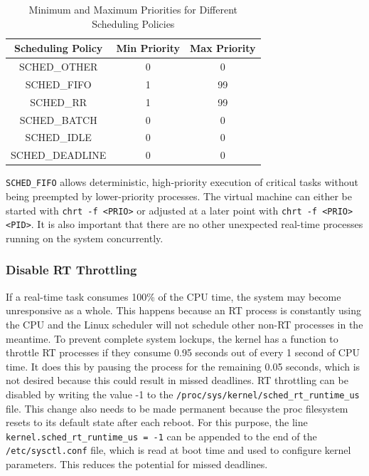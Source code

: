 \documentclass[MMR,Master,english]{style/twbook}
\begin{document}
\begin{table}[H]
	\centering
	\caption{Minimum and Maximum Priorities for Different Scheduling Policies}
	\label{tab:scheduling_priorities}
	\setlength{\tabcolsep}{0.5em} %
	{\renewcommand{\arraystretch}{1.2}%
		\begin{tabular}{|c|c|c|}
			\hline
			\textbf{Scheduling Policy} & \textbf{Min Priority} & \textbf{Max Priority} \\ \hline
			SCHED\_OTHER               & 0                     & 0                     \\ \hline
			SCHED\_FIFO                & 1                     & 99                    \\ \hline
			SCHED\_RR                  & 1                     & 99                    \\ \hline
			SCHED\_BATCH               & 0                     & 0                     \\ \hline
			SCHED\_IDLE                & 0                     & 0                     \\ \hline
			SCHED\_DEADLINE            & 0                     & 0                     \\ \hline
		\end{tabular}}
\end{table}

\noindent \texttt{SCHED\_FIFO} allows deterministic, high-priority execution of critical tasks without being preempted by lower-priority processes. The virtual machine can either be started with \texttt{chrt -f <PRIO>} or adjusted at a later point with \texttt{chrt -f <PRIO> <PID>}. It is also important that there are no other unexpected real-time processes running on the system concurrently.

\subsubsection{Disable RT Throttling}
If a real-time task consumes 100\% of the CPU time, the system may become unresponsive as a whole. This happens because an RT process is constantly using the CPU and the Linux scheduler will not schedule other non-RT processes in the meantime. To prevent complete system lockups, the kernel has a function to throttle RT processes if they consume 0.95 seconds out of every 1 second of CPU time. It does this by pausing the process for the remaining 0.05 seconds, which is not desired because this could result in missed deadlines. RT throttling can be disabled by writing the value -1 to the \texttt{/proc/sys/kernel/sched\_rt\_runtime\_us} file. This change also needs to be made permanent because the proc filesystem resets to its default state after each reboot. For this purpose, the line \texttt{kernel.sched\_rt\_runtime\_us = -1} can be appended to the end of the \texttt{/etc/sysctl.conf} file, which is read at boot time and used to configure kernel parameters. This reduces the potential for missed deadlines.
\end{document}
